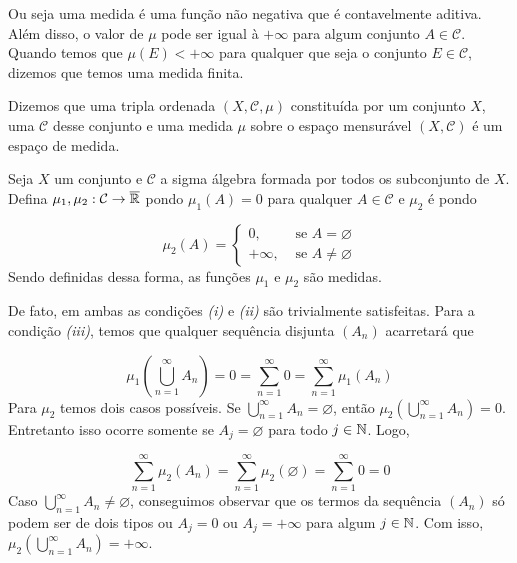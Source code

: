 Ou seja uma medida é uma função não negativa que é contavelmente aditiva.
Além disso, o valor de $\mu$ pode ser igual à $+\infty$ para algum conjunto $A \in \mathcal{C}$.
Quando temos que $\mu(E) < +\infty$ para qualquer que seja o conjunto $E \in \mathcal{C}$, dizemos que temos uma medida finita.

\begin{definition}
	\label{def:espaço-de-medida}
	Dizemos que uma tripla ordenada $(X, \mathcal{C}, \mu)$ constituída por um conjunto $X$, uma \sigal $\mathcal{C}$ desse conjunto e uma medida $\mu$ sobre o espaço mensurável $(X, \mathcal{C})$ é um espaço de medida.
\end{definition}



\begin{example}
    Seja $X$ um conjunto e $\mathcal{C}$ a sigma álgebra formada por todos os subconjunto de $X$.    
    Defina $\mu_1, \mu_2:\mathcal{C} \to \operatorname{\overline{\mathbb{R}}}$ pondo $\mu_1(A) = 0$ para qualquer  $A \in \mathcal{C}$ e 
    $\mu_2$ é  pondo 

$$\mu_2(A) = \left\{\begin{array}{cc}
0, & \textrm{\ se \ } A = \varnothing \\
+\infty,& \textrm{\ se \ } A \neq \varnothing
\end{array}\right.$$
Sendo definidas dessa forma, as funções $\mu_1$ e $\mu_2$ são medidas.
\end{example}

De fato, em ambas as condições \textit{(i)} e \textit{(ii)} são trivialmente satisfeitas.
Para a condição \textit{(iii)}, temos que qualquer sequência disjunta $(A_n)$ acarretará que

$$\mu_1\left(\bigcup_{n = 1}^\infty A_n\right) = 0 = \sum_{n = 1}^\infty 0 = \sum_{n = 1}^\infty \mu_1(A_n) $$
Para $\mu_2$ temos dois casos possíveis.
Se  $\displaystyle \bigcup_{n = 1}^\infty A_n  = \varnothing$, então $\mu_2\left(\displaystyle \bigcup_{n = 1}^\infty A_n\right) = 0$. Entretanto isso ocorre somente se $A_j = \varnothing$ para todo $j \in \operatorname{\mathbb{N}}$.
Logo, 

$$\sum_{n = 1}^\infty \mu_2(A_n) = \sum_{n = 1}^\infty \mu_2(\varnothing) = \sum_{n = 1}^\infty 0 = 0$$
Caso $\displaystyle \bigcup_{n = 1}^\infty A_n  \neq  \varnothing$, conseguimos observar que os termos da sequência $(A_n)$ só podem ser de dois tipos ou $A_j = 0$ ou $A_j = +\infty$ para algum $j \in \operatorname{\mathbb{N}}$. Com isso,  $\mu_2\left(\displaystyle \bigcup_{n = 1}^\infty A_n\right) = +\infty$.

